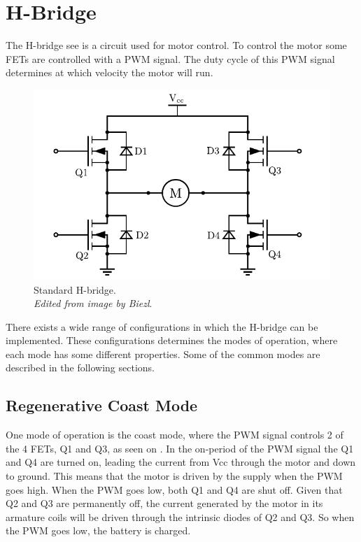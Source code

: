 
\section{H-Bridge}\label{sec:HBridge}
The H-bridge see  is a circuit used for motor control. To control the motor some FETs are controlled with a PWM signal. The duty cycle of this PWM signal determines at which velocity the motor will run.\cite{DCook}

\begin{figure}[H]
	\centering
	\includegraphics[scale=.6]{figures/Hbridge.pdf}
	\caption{Standard H-bridge.\\ \emph{Edited from image by Biezl}.\cite{Biezl}}
	\label{Hbridge}
\end{figure}

There exists a wide range of configurations in which the H-bridge can be implemented. These configurations determines the modes of operation, where each mode has some different properties. Some of the common modes are described in the following sections.\cite{DCook}

\subsection{Regenerative Coast Mode}
One mode of operation is the coast mode, where the PWM signal controls 2 of the 4 FETs, Q1 and Q3, as seen on . In the on-period of the PWM signal the Q1 and Q4 are turned on, leading the current from Vcc through the motor and down to ground. This means that the motor is driven by the supply when the PWM goes high. When the PWM goes low, both Q1 and Q4 are shut off. Given that Q2 and Q3 are permanently off, the current generated by the motor in its armature coils will be driven through the intrinsic diodes of Q2 and Q3. So when the PWM goes low, the battery is charged.\cite{PAndersen}

